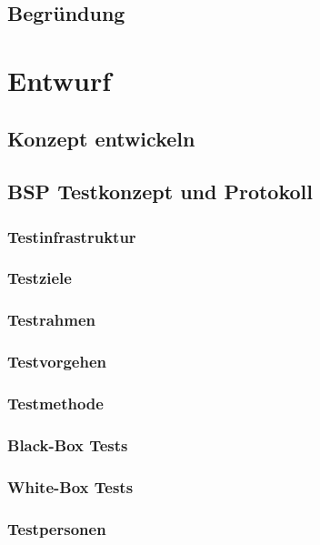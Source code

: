 \documentclass{report}
\begin{document}
\section{Begründung}

\chapter{Entwurf}
\section{Konzept entwickeln}
\section{BSP Testkonzept und Protokoll}
\subsection{Testinfrastruktur}
\subsection{Testziele}
\subsection{Testrahmen}
\subsection{Testvorgehen}
\subsection{Testmethode}
\subsection{Black-Box Tests}
\subsection{White-Box Tests}
\subsection{Testpersonen}
\end{document}
